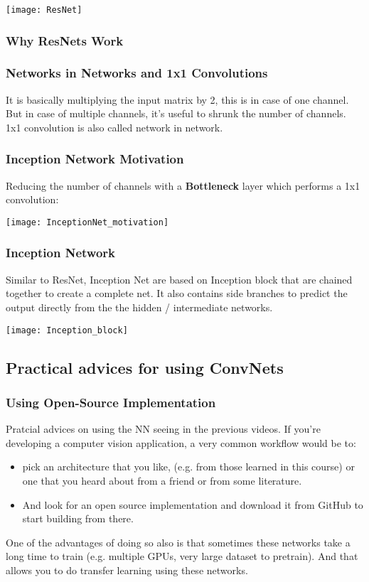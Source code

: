 \texttt{[image: ResNet]}

\subsubsection{Why ResNets Work}

\subsubsection{Networks in Networks and 1x1 Convolutions}
It is basically multiplying the input matrix by 2, this is in case of one channel. But in case of multiple channels, it's useful to shrunk the number of channels.
1x1 convolution is also called network in network.

\subsubsection{Inception Network Motivation}
Reducing the number of channels with a \textbf{Bottleneck} layer which performs a 1x1 convolution:


\texttt{[image: InceptionNet\_motivation]}

\subsubsection{Inception Network}
Similar to ResNet, Inception Net are based on Inception block that are chained together to create a complete net. It also contains side branches to predict the output directly from the the hidden / intermediate networks.


\texttt{[image: Inception\_block]}

\subsection{Practical advices for using ConvNets}

\subsubsection{Using Open-Source Implementation}
Pratcial advices on using the NN seeing in the previous videos.
If you're developing a computer vision application, a very common workflow would be to: 
\begin{itemize}
    \item pick an architecture that you like, (e.g. from those learned in this course) or one that you heard about from a friend or from some literature. 
    \item And look for an open source implementation and download it from GitHub to start building from there.
\end{itemize}
One of the advantages of doing so also is that sometimes these networks take a long time to train (e.g. multiple GPUs, very large dataset to pretrain). And that allows you to do transfer learning using these networks. 

